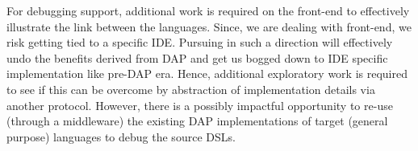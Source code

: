 \documentclass[dvipsnames]{article}
\begin{document}
For debugging support, additional work is required on the front-end to effectively illustrate the link between the languages.
Since, we are dealing with front-end, we risk getting tied to a specific IDE.
Pursuing in such a direction will effectively undo the benefits derived from DAP and get us bogged down to IDE specific implementation like pre-DAP era.
Hence, additional exploratory work is required to see if this can be overcome by abstraction of implementation details via another protocol.
However, there is a possibly impactful opportunity to re-use (through a middleware) the existing DAP implementations of target (general purpose) languages to debug the source DSLs.

\printbibliography
% 
% 
\end{document}
